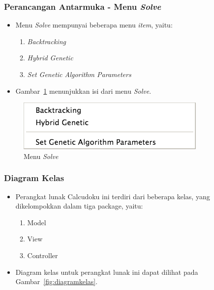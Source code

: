 \documentclass{beamer}
\begin{document}
\begin{frame}
\frametitle{Perancangan Antarmuka - Menu \textit{Solve}}
\begin{itemize}
\item Menu \textit{Solve} mempunyai beberapa menu \textit{item}, yaitu:
	\begin{enumerate}
	\item \textit{Backtracking}
	\item \textit{Hybrid Genetic}
	\item \textit{Set Genetic Algorithm Parameters}
	\end{enumerate}
\item Gambar~\ref{fig:perancanganguimenusolve} menunjukkan isi dari menu \textit{Solve}.
\end{itemize}
\begin{figure}
\centering
\captionsetup{justification=centering}
\includegraphics[scale=0.5]{Gambar/Perancangan/PerancanganGUIMenuSolve.png}
\caption[Menu \textit{Solve}]{Menu \textit{Solve}}
\label{fig:perancanganguimenusolve}
\end{figure}
\end{frame}


\begin{frame}
\frametitle{Diagram Kelas}
\begin{itemize}
\item Perangkat lunak Calcudoku ini terdiri dari beberapa kelas, yang dikelompokkan dalam tiga package, yaitu:
	\begin{enumerate}
	\item Model
	\item View
	\item Controller
	\end{enumerate}
\item Diagram kelas untuk perangkat lunak ini dapat dilihat pada Gambar~\ref{fig:diagramkelas}.
\end{itemize}
\end{frame}
\end{document}
